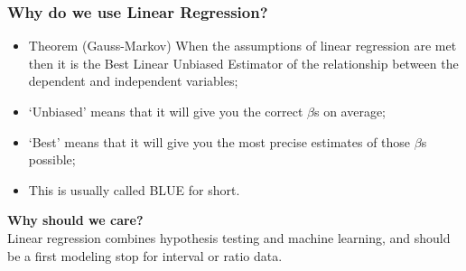 \documentclass[aspectratio=169]{beamer}
\theoremstyle{principle}
\begin{document}
\begin{frame}
\frametitle{Why do we use Linear Regression?}

\begin{itemize}
\item Theorem (Gauss-Markov) When the assumptions of linear regression are met then it is the Best Linear Unbiased Estimator of the relationship between the dependent and independent variables;
\bigskip
\bigskip

\item `Unbiased' means that it will give you the correct $\beta$s on average;
\bigskip
\bigskip

\item `Best' means that it will give you the most precise estimates of those $\beta$s possible;
\bigskip
\bigskip

\item This is usually called BLUE for short.

\end{itemize}

\end{frame}

\begin{frame}

\begin{center}
\Huge\textbf{Why should we care?}\\
\bigskip
\bigskip
\large Linear regression combines hypothesis testing and machine learning, and should be a first modeling stop for interval or ratio data.\\
\end{center}

\end{frame}
\end{document}
